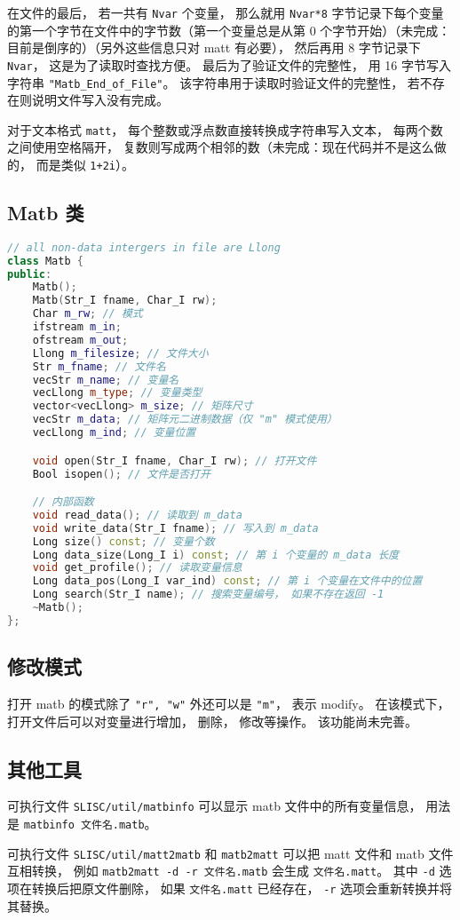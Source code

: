 在文件的最后， 若一共有 \verb|Nvar| 个变量， 那么就用 \verb|Nvar*8| 字节记录下每个变量的第一个字节在文件中的字节数（第一个变量总是从第 0 个字节开始）（未完成：目前是倒序的）（另外这些信息只对 matt 有必要）， 然后再用 8 字节记录下 \verb|Nvar|， 这是为了读取时查找方便。 最后为了验证文件的完整性， 用 16 字节写入字符串 \verb|"Matb_End_of_File"|。 该字符串用于读取时验证文件的完整性， 若不存在则说明文件写入没有完成。

对于文本格式 \verb|matt|， 每个整数或浮点数直接转换成字符串写入文本， 每两个数之间使用空格隔开， 复数则写成两个相邻的数（未完成：现在代码并不是这么做的， 而是类似 \verb|1+2i|）。

\subsection{Matb 类}
\begin{lstlisting}[language=cpp]
// all non-data intergers in file are Llong
class Matb {
public:
    Matb();
    Matb(Str_I fname, Char_I rw);
    Char m_rw; // 模式
    ifstream m_in;
    ofstream m_out;
    Llong m_filesize; // 文件大小
    Str m_fname; // 文件名
    vecStr m_name; // 变量名
    vecLlong m_type; // 变量类型
    vector<vecLlong> m_size; // 矩阵尺寸
    vecStr m_data; // 矩阵元二进制数据（仅 "m" 模式使用）
    vecLlong m_ind; // 变量位置

    void open(Str_I fname, Char_I rw); // 打开文件
    Bool isopen(); // 文件是否打开

    // 内部函数
    void read_data(); // 读取到 m_data
    void write_data(Str_I fname); // 写入到 m_data
    Long size() const; // 变量个数
    Long data_size(Long_I i) const; // 第 i 个变量的 m_data 长度
    void get_profile(); // 读取变量信息
    Long data_pos(Long_I var_ind) const; // 第 i 个变量在文件中的位置
    Long search(Str_I name); // 搜索变量编号， 如果不存在返回 -1
    ~Matb();
};
\end{lstlisting}

\subsection{修改模式}
打开 matb 的模式除了 \verb|"r", "w"| 外还可以是 \verb|"m"|， 表示 modify。 在该模式下， 打开文件后可以对变量进行增加， 删除， 修改等操作。 该功能尚未完善。

\subsection{其他工具}
可执行文件 \verb|SLISC/util/matbinfo| 可以显示 matb 文件中的所有变量信息， 用法是 \verb|matbinfo 文件名.matb|。

可执行文件 \verb|SLISC/util/matt2matb| 和 \verb|matb2matt| 可以把 matt 文件和 matb 文件互相转换， 例如 \verb|matb2matt -d -r 文件名.matb| 会生成 \verb|文件名.matt|。 其中 \verb|-d| 选项在转换后把原文件删除， 如果 \verb|文件名.matt| 已经存在， \verb|-r| 选项会重新转换并将其替换。
